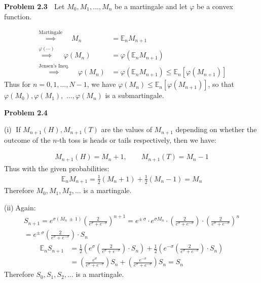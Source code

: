 \documentclass[12pt, letterpaper]{article}
\begin{document}
\vspace{5mm}
\noindent
\textbf{Problem 2.3} $\;$ Let $M_0, M_1, \dots, M_n$ be a martingale and let $\varphi$ be a convex function.

\begin{align*}
    \overset{\text{Martingale}}\implies \quad M_n &= \mathbb E_n M_{n+1} \\
    \overset{\varphi(\cdots)}\implies \quad \varphi \left( M_n \right) &= \varphi \left( \mathbb E_n M_{n+1} \right) \\
    \overset{\text{Jensen's Ineq.}}\implies \quad \varphi \left( M_n \right) &= \varphi \left( \mathbb E_n M_{n+1} \right) \leq \mathbb E_n \left[ \varphi (M_{n+1})\right]
\end{align*}
Thus for $n = 0, 1, \dots, N-1$, we have $\varphi \left( M_n \right) \leq \mathbb E_n \left[ \varphi (M_{n+1})\right]$,
so that $\varphi(M_0), \varphi(M_1),$
$\dots, \varphi(M_n)$ is a submartingale.

\rightline{$\square$}

\vspace{5mm}
\noindent
\textbf{Problem 2.4}

\vspace{5mm}
\noindent
(i)$\;$ If $M_{n+1}(H), M_{n+1}(T)$ are the values of $M_{n+1}$ depending on whether the outcome of the $n$-th toss is heads or tails respectively, then we have:

\begin{align*}
    M_{n+1}(H) = M_n + 1, \quad \quad M_{n+1}(T) = M_n - 1
\end{align*}
Thus with the given probabilities:
\begin{gather*}
    \mathbb E_n M_{n+1} = \tfrac 1 2 (M_n +1) + \tfrac 1 2 (M_n - 1) = M_n
\end{gather*}
Therefore $M_0, M_1, M_2, \dots$ is a martingale.

\rightline{$\square$}

\vspace{5mm}
\noindent
(ii)$\;$Again:
\begin{gather*}
    S_{n+1} = e^{\sigma \left( M_n \,\pm\, 1\right)} \left( \frac{2}{e^\sigma + e^{-\sigma}}\right)^{n+1} = e^{\pm \, \sigma} \cdot e^{\sigma M_n} \cdot \left( \frac{2}{e^\sigma + e^{-\sigma}}\right) \cdot \left( \frac{2}{e^\sigma + e^{-\sigma}}\right)^{n} \\
    = e^{\pm \, \sigma} \left( \frac{2}{e^\sigma + e^{-\sigma}}\right) \cdot S_n
\end{gather*}
\begin{align*}
    \mathbb E_n S_{n+1} &= \tfrac{1}{2} \left( e^{\sigma} \left( \frac{2}{e^\sigma + e^{-\sigma}}\right) \cdot S_n \right)
    + \tfrac{1}{2} \left( e^{-\sigma} \left( \frac{2}{e^\sigma + e^{-\sigma}}\right) \cdot S_n \right) \\
    &= \left( \frac{e^\sigma}{e^\sigma + e^{-\sigma}} \right) S_n + \left( \frac{e^{-\sigma}}{e^\sigma + e^{-\sigma}} \right) S_n = S_n
\end{align*}
Therefore $S_0, S_1, S_2, \dots$ is a martingale.
\end{document}
